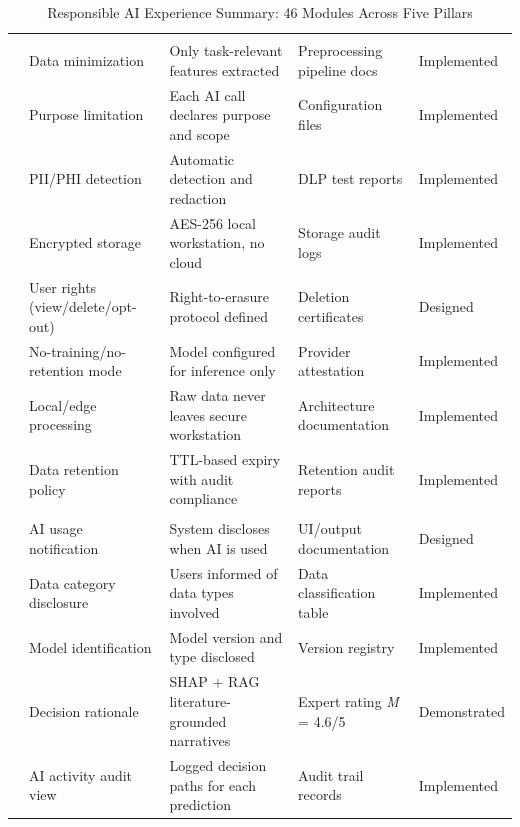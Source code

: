 \begin{xltabular}
{\textwidth}{@{} p{1.5cm} p{2.5cm} L L p{2.5cm} @{}}
\caption{Responsible AI Experience Summary: 46 Modules Across Five Pillars}\label{tab:rai_experience_overview} \\
\toprule
{} &  &  &  &  \\
\midrule
\endfirsthead
\endhead
\bottomrule
\endfoot
{} \\
\addlinespace
& Data minimization & Only task-relevant features extracted & Preprocessing pipeline docs & Implemented \\
& Purpose limitation & Each AI call declares purpose and scope & Configuration files & Implemented \\
& PII/PHI detection & Automatic detection and redaction & DLP test reports & Implemented \\
& Encrypted storage & AES-256 local workstation, no cloud & Storage audit logs & Implemented \\
& User rights (view/delete/opt-out) & Right-to-erasure protocol defined & Deletion certificates & Designed \\
& No-training/no-retention mode & Model configured for inference only & Provider attestation & Implemented \\
& Local/edge processing & Raw data never leaves secure workstation & Architecture documentation & Implemented \\
& Data retention policy & TTL-based expiry with audit compliance & Retention audit reports & Implemented \\
\addlinespace
{} \\
\addlinespace
& AI usage notification & System discloses when AI is used & UI/output documentation & Designed \\
& Data category disclosure & Users informed of data types involved & Data classification table & Implemented \\
& Model identification & Model version and type disclosed & Version registry & Implemented \\
& Decision rationale & SHAP + RAG literature-grounded narratives & Expert rating \textit{M} = 4.6/5 & Demonstrated \\
& AI activity audit view & Logged decision paths for each prediction & Audit trail records & Implemented \\

\end{xltabular}
